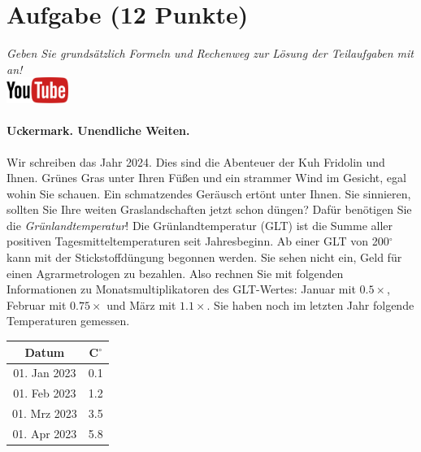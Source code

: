 \documentclass[a4paper, 9pt]{scrartcl}\usepackage[]{graphicx}\usepackage[]{xcolor}
\begin{document}
\clearpage

\section{Aufgabe \hfill (12 Punkte)}

\textit{Geben Sie grunds{\"a}tzlich Formeln und Rechenweg zur L{\"o}sung der
  Teilaufgaben mit an!} \\[1Ex]

\hfill\href{https://youtu.be/fiWGgCX-cE4}{\includegraphics[width =
  2cm]{img/youtube}} %
\hspace{2Ex}



\paragraph{Uckermark. Unendliche Weiten.}



Wir schreiben das Jahr 2024. Dies sind die Abenteuer
der Kuh Fridolin und Ihnen. Gr{\"u}nes Gras unter Ihren F{\"u}{\ss}en und
ein strammer Wind im Gesicht, egal wohin Sie schauen. Ein schmatzendes
Ger{\"a}usch ert{\"o}nt unter Ihnen. Sie sinnieren, sollten Sie Ihre weiten
Graslandschaften jetzt schon d{\"u}ngen?  Daf{\"u}r ben{\"o}tigen Sie die
\textit{Gr{\"u}nlandtemperatur}! Die Gr{\"u}nlandtemperatur (GLT) ist die Summe aller
positiven Tagesmitteltemperaturen seit Jahresbeginn. Ab einer GLT von
200$^\circ$ kann mit der Stickstoffd{\"u}ngung begonnen werden. Sie sehen nicht
ein, Geld f{\"u}r einen Agrarmetrologen zu bezahlen. Also rechnen Sie mit
folgenden Informationen zu Monatsmultiplikatoren des GLT-Wertes: Januar mit
$0.5\times$, Februar mit $0.75\times$ und M{\"a}rz mit
$1.1\times$. Sie haben noch im letzten Jahr folgende Temperaturen
gemessen.

\begin{center}
\begin{tabular}{cc}
  \toprule
  Datum & C$^\circ$ \\
  \midrule
  01. Jan 2023 & 0.1\\
  01. Feb 2023 & 1.2\\
  01. Mrz 2023 & 3.5\\
  01. Apr 2023 & 5.8\\
  \bottomrule
\end{tabular}
\end{center}
\end{document}
